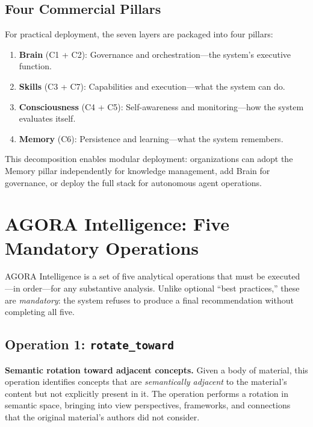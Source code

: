 \documentclass[11pt,a4paper]{article}
\begin{document}
\subsection{Four Commercial Pillars}

For practical deployment, the seven layers are packaged into four pillars:

\begin{enumerate}
    \item \textbf{Brain} (C1 + C2): Governance and orchestration---the system's executive function.
    \item \textbf{Skills} (C3 + C7): Capabilities and execution---what the system can do.
    \item \textbf{Consciousness} (C4 + C5): Self-awareness and monitoring---how the system evaluates itself.
    \item \textbf{Memory} (C6): Persistence and learning---what the system remembers.
\end{enumerate}

This decomposition enables modular deployment: organizations can adopt the Memory pillar independently for knowledge management, add Brain for governance, or deploy the full stack for autonomous agent operations.

\section{AGORA Intelligence: Five Mandatory Operations}
\label{sec:agora_intelligence}

AGORA Intelligence is a set of five analytical operations that must be executed---in order---for any substantive analysis. Unlike optional ``best practices,'' these are \emph{mandatory}: the system refuses to produce a final recommendation without completing all five.

\subsection{Operation 1: \texttt{rotate\_toward}}

\textbf{Semantic rotation toward adjacent concepts.} Given a body of material, this operation identifies concepts that are \emph{semantically adjacent} to the material's content but not explicitly present in it. The operation performs a rotation in semantic space, bringing into view perspectives, frameworks, and connections that the original material's authors did not consider.
\end{document}
